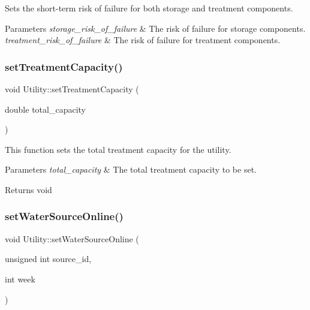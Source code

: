 Sets the short-\/term risk of failure for both storage and treatment components. 


\begin{DoxyParams}{Parameters}
{\em storage\+\_\+risk\+\_\+of\+\_\+failure} & The risk of failure for storage components. \\
\hline
{\em treatment\+\_\+risk\+\_\+of\+\_\+failure} & The risk of failure for treatment components. \\
\hline
\end{DoxyParams}
\mbox{\label{classUtility_ae2dd2175d9fe1d71ea1f1e8b43a21148}} 
\subsubsection{\texorpdfstring{set\+Treatment\+Capacity()}{setTreatmentCapacity()}}
{\footnotesize\ttfamily void Utility\+::set\+Treatment\+Capacity (\begin{DoxyParamCaption}\item[{double}]{total\+\_\+capacity }\end{DoxyParamCaption})}



This function sets the total treatment capacity for the utility. 


\begin{DoxyParams}{Parameters}
{\em total\+\_\+capacity} & The total treatment capacity to be set.\\
\hline
\end{DoxyParams}
\begin{DoxyReturn}{Returns}
void 
\end{DoxyReturn}
\mbox{\label{classUtility_ae01127adf3c99415310e77b22bd9f3b5}} 
\subsubsection{\texorpdfstring{set\+Water\+Source\+Online()}{setWaterSourceOnline()}}
{\footnotesize\ttfamily void Utility\+::set\+Water\+Source\+Online (\begin{DoxyParamCaption}\item[{unsigned int}]{source\+\_\+id,  }\item[{int}]{week }\end{DoxyParamCaption})}



